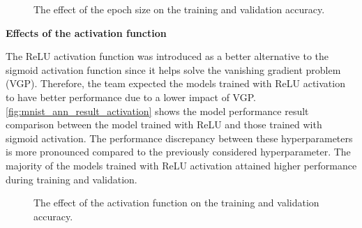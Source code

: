 \documentclass[a4paper]{article}
\begin{document}
\begin{figure} [h!]
    \caption{The effect of the epoch size on the training and validation accuracy.} 
    \label{fig:mnist_ann_result_epoch}
\end{figure}

\textbf{Effects of the activation function}

The ReLU activation function was introduced as a better alternative to the sigmoid activation function since it helps solve the vanishing gradient problem (VGP). Therefore, the team expected the models trained with ReLU activation to have better performance due to a lower impact of VGP. \autoref{fig:mnist_ann_result_activation} shows the model performance result comparison between the model trained with ReLU and those trained with sigmoid activation. The performance discrepancy between these hyperparameters is more pronounced compared to the previously considered hyperparameter. The majority of the models trained with ReLU activation attained higher performance during training and validation.

\begin{figure} [h!]
    \caption{The effect of the activation function on the training and validation accuracy.} 
    \label{fig:mnist_ann_result_activation}
\end{figure}
\end{document}
